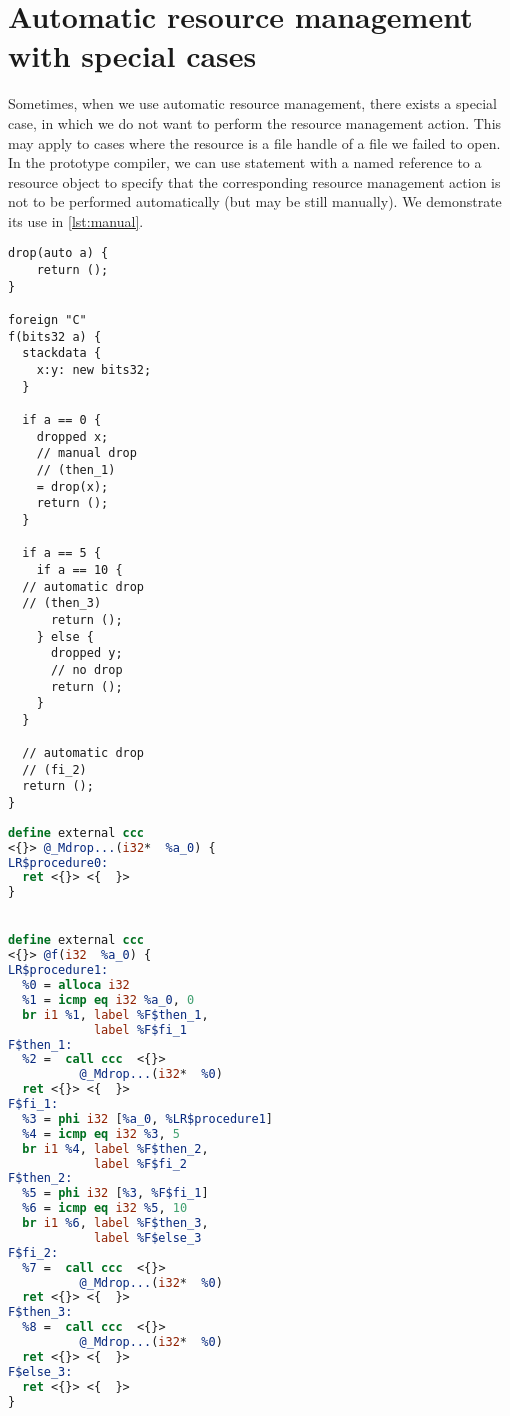 \section{Automatic resource management with special cases}

Sometimes, when we use automatic resource management, there exists a special case, in which we do not want to perform the resource management action. This may apply to cases where the resource is a file handle of a file we failed to open. In the prototype compiler, we can use  statement with a named reference to a resource object to specify that the corresponding resource management action is not to be performed automatically (but may be still manually). We demonstrate its use in \cref{lst:manual}.


\begin{listing}
    \small
    \caption{Example of automatic resource management with special cases (parts of names left out due to their length)}
    \label{lst:manual}
    \begin{center}
    \begin{minipage}{0.35\linewidth}
    \begin{lstlisting}
drop(auto a) {
    return ();
}

foreign "C"
f(bits32 a) {
  stackdata {
    x:y: new bits32;
  }

  if a == 0 {
    dropped x;
    // manual drop
    // (then_1)
    = drop(x);
    return ();
  }

  if a == 5 {
    if a == 10 {
  // automatic drop
  // (then_3)
      return ();
    } else {
      dropped y;
      // no drop
      return ();
    }
  }

  // automatic drop
  // (fi_2)
  return ();
}
    \end{lstlisting}
    \end{minipage}%
    \begin{minipage}{0.65\linewidth}
    \begin{lstlisting}[language=LLVM]
define external ccc
<{}> @_Mdrop...(i32*  %a_0) {
LR$procedure0:
  ret <{}> <{  }>
}


define external ccc
<{}> @f(i32  %a_0) {
LR$procedure1:
  %0 = alloca i32
  %1 = icmp eq i32 %a_0, 0
  br i1 %1, label %F$then_1,
            label %F$fi_1
F$then_1:
  %2 =  call ccc  <{}>
          @_Mdrop...(i32*  %0)
  ret <{}> <{  }>
F$fi_1:
  %3 = phi i32 [%a_0, %LR$procedure1]
  %4 = icmp eq i32 %3, 5
  br i1 %4, label %F$then_2,
            label %F$fi_2
F$then_2:
  %5 = phi i32 [%3, %F$fi_1]
  %6 = icmp eq i32 %5, 10
  br i1 %6, label %F$then_3,
            label %F$else_3
F$fi_2:
  %7 =  call ccc  <{}>
          @_Mdrop...(i32*  %0)
  ret <{}> <{  }>
F$then_3:
  %8 =  call ccc  <{}>
          @_Mdrop...(i32*  %0)
  ret <{}> <{  }>
F$else_3:
  ret <{}> <{  }>
}
    \end{lstlisting}
    \end{minipage}
    \end{center}
\end{listing}

